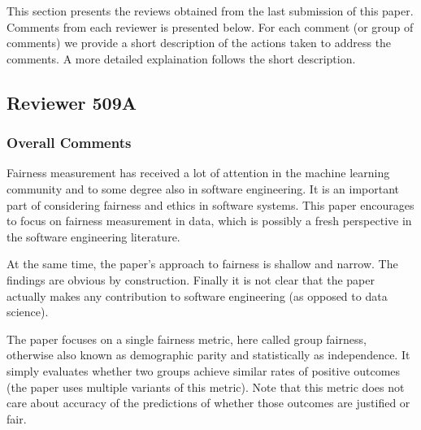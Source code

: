 \documentclass[conference,review,anonymous]{IEEEtran}
\begin{document}

This section presents the reviews obtained from the last submission of
this paper. Comments from each reviewer is presented below. For each
comment (or group of comments) we provide a short description of the
actions taken to address the comments. A more detailed explaination
follows the short description.

\subsection{Reviewer 509A}
\subsubsection{Overall Comments}

Fairness measurement has received a lot of attention in the machine
learning community and to some degree also in software engineering. It
is an important part of considering fairness and ethics in software
systems. This paper encourages to focus on fairness measurement in
data, which is possibly a fresh perspective in the software
engineering literature.

At the same time, the paper’s approach to fairness is shallow and
narrow. The findings are obvious by construction. Finally it is not
clear that the paper actually makes any contribution to software
engineering (as opposed to data science).

The paper focuses on a single fairness metric, here called group
fairness, otherwise also known as demographic parity and statistically
as independence. It simply evaluates whether two groups achieve
similar rates of positive outcomes (the paper uses multiple variants
of this metric). Note that this metric does not care about accuracy of
the predictions of whether those outcomes are justified or fair.
\end{document}
